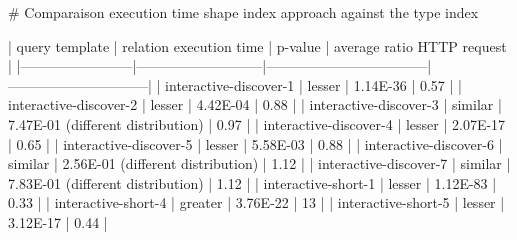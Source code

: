 
# Comparaison execution time shape index approach against the type index

| query template         | relation execution time   | p-value                           |   average ratio HTTP request |
|------------------------|---------------------------|-----------------------------------|------------------------------|
| interactive-discover-1 | lesser                    | 1.14E-36                          |                         0.57 |
| interactive-discover-2 | lesser                    | 4.42E-04                          |                         0.88 |
| interactive-discover-3 | similar                   | 7.47E-01 (different distribution) |                         0.97 |
| interactive-discover-4 | lesser                    | 2.07E-17                          |                         0.65 |
| interactive-discover-5 | lesser                    | 5.58E-03                          |                         0.88 |
| interactive-discover-6 | similar                   | 2.56E-01 (different distribution) |                         1.12 |
| interactive-discover-7 | similar                   | 7.83E-01 (different distribution) |                         1.12 |
| interactive-short-1    | lesser                    | 1.12E-83                          |                         0.33 |
| interactive-short-4    | greater                   | 3.76E-22                          |                        13    |
| interactive-short-5    | lesser                    | 3.12E-17                          |                         0.44 |
